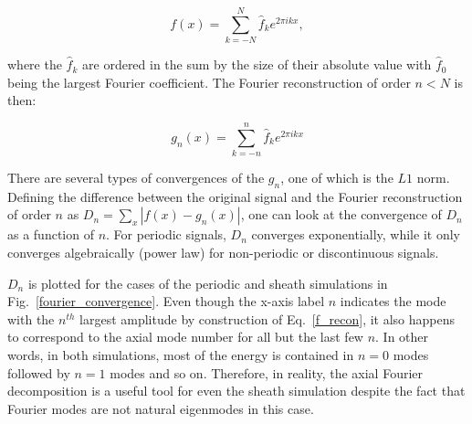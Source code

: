 \documentclass[showpacs,preprintnumbers,amsmath,amssymb,superscriptaddress,aip]{revtex4-1}
\def\beq{\begin{equation}}
\def\eeq{\end{equation}}
\begin{document}
\beq
\label{f_decomp}
f(x) = \sum_{k=-N}^{N} \hat{f}_k e^{2 \pi i k x},
\eeq

where the $\hat{f}_k$ are ordered in the sum by the size of their absolute value with $\hat{f}_0$ being the largest Fourier coefficient. The Fourier reconstruction of order $n<N$ is then:

\beq
\label{f_recon}
g_n(x) = \sum_{k=-n}^{n} \hat{f}_k e^{2 \pi i k x}
\eeq

There are several types of convergences of the $g_n$, one of which is the $L1$ norm. Defining the difference between the original signal and the Fourier reconstruction of order $n$ as
$D_n = \sum_x |f(x) - g_n(x)|$, one can look at the convergence of $D_n$ as a function of $n$. For periodic signals, $D_n$ converges exponentially, while it only converges algebraically
(power law) for non-periodic or discontinuous signals. 

$D_n$ is plotted for the cases of the periodic and sheath simulations in Fig.~\ref{fourier_convergence}. Even though the x-axis label $n$ indicates the mode with the $n^{th}$ largest amplitude
by construction of Eq.~\ref{f_recon}, it also happens to correspond to the axial mode number for all but the last few $n$. In other words, in both simulations, most of the energy is contained
in $n=0$ modes followed by $n=1$ modes and so on. Therefore, in reality, the axial Fourier decomposition is a useful tool for even the sheath simulation despite the fact that Fourier
modes are not natural eigenmodes in this case.


%
%
\end{document}
